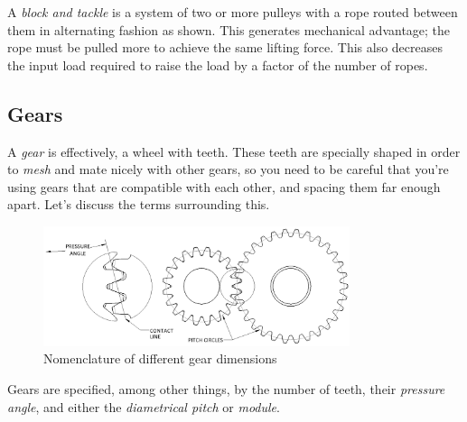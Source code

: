 \documentclass[10pt,letterpaper]{book}
\begin{document}
A \textit{block and tackle} is a system of two or more pulleys with a rope routed between them in alternating fashion as shown. This generates mechanical advantage; the rope must be pulled more to achieve the same lifting force. This also decreases the input load required to raise the load by a factor of the number of ropes. 

\subsection{Gears}

A \textit{gear} is effectively, a wheel with teeth. These teeth are specially shaped in order to \textit{mesh} and mate nicely with other gears, so you need to be careful that you're using gears that are compatible with each other, and spacing them far enough apart. Let's discuss the terms surrounding this.

\begin{figure}[H]
	\includegraphics[width=0.8\textwidth]{imgs/gear_nomenclature.png}
	\caption{Nomenclature of different gear dimensions}
\end{figure}

Gears are specified, among other things, by the number of teeth, their \textit{pressure angle}, and either the \textit{diametrical pitch} or \textit{module}.
\end{document}
